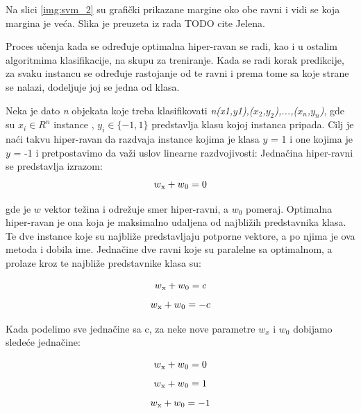 \documentclass[12pt,oneside]{memoir}
\begin{document}
Na slici \ref{img:svm_2} su grafički prikazane margine oko obe ravni i vidi se koja margina je veća. Slika je preuzeta iz rada TODO cite Jelena. 

Proces učenja kada se određuje optimalna hiper-ravan se radi, kao i u ostalim algoritmima klasifikacije, na skupu za treniranje.  Kada se radi korak predikcije, za svaku instancu se određuje rastojanje od te ravni i prema tome sa koje strane se nalazi, dodeljuje joj se jedna od klasa. 

Neka je dato \textit{n} objekata koje treba klasifikovati \textit{n\normalfont(x1,y1\normalfont),\normalfont($x_2$,$y_2$\normalfont),...,\normalfont($x_n$,$y_n$\normalfont)},  gde su $x_i \in R^n$ instance ,   $y_i \in \{-1,1\}$ predstavlja klasu kojoj instanca pripada.  Cilj je naći takvu hiper-ravan da razdvaja instance kojima je klasa $y$ = 1 i one kojima je $y$ = -1 i pretpostavimo da važi uslov linearne razdvojivosti:
Jednačina hiper-ravni se predstavlja izrazom:
\begin{equation}
	w\textsubscript{x}+w\textsubscript{0} = 0
\end{equation}

gde je $w$ vektor težina i odrežuje smer hiper-ravni, a $w_0$ pomeraj.  Optimalna hiper-ravan je ona koja je maksimalno udaljena od najbližih predstavnika klasa.  Te dve instance koje su najbliže predstavljaju potporne vektore, a po njima je ova metoda i dobila ime. Jednačine dve ravni koje su paralelne sa optimalnom,  a prolaze kroz te najbliže predstavnike klasa su:

\begin{equation}
	w\textsubscript{x}+w\textsubscript{0} = c \\
\end{equation}
\begin{equation}
	w\textsubscript{x}+w\textsubscript{0} = -c
\end{equation}

Kada podelimo sve jednačine sa c, za neke nove parametre $w_x$ i $w_0$ dobijamo sledeće jednačine:

\begin{equation}
	w\textsubscript{x}+w\textsubscript{0} = 0
\end{equation}
\begin{equation}
	w\textsubscript{x}+w\textsubscript{0} = 1
\end{equation}
\begin{equation}
	w\textsubscript{x}+w\textsubscript{0} = -1
\end{equation}
\end{document}
